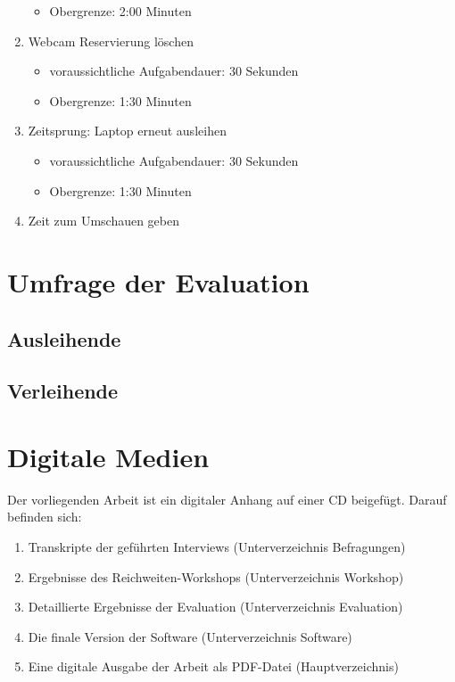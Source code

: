 \begin{enumerate}
\begin{itemize}
                \item Obergrenze: 2:00 Minuten
            \end{itemize}
    \item Webcam Reservierung löschen
            \begin{itemize}
                \item voraussichtliche Aufgabendauer: 30 Sekunden
                \item Obergrenze: 1:30 Minuten
            \end{itemize}
    \item Zeitsprung: Laptop erneut ausleihen
            \begin{itemize}
                \item voraussichtliche Aufgabendauer: 30 Sekunden
                \item Obergrenze: 1:30 Minuten
            \end{itemize}
    \item Zeit zum Umschauen geben
\end{enumerate}

\section{Umfrage der Evaluation}
\subsection{Ausleihende}
\subsection{Verleihende}

\section{Digitale Medien}
Der vorliegenden Arbeit ist ein digitaler Anhang auf einer CD beigefügt. Darauf befinden sich:
{\begin{enumerate}
    \item Transkripte der geführten Interviews (Unterverzeichnis Befragungen)
    \item Ergebnisse des Reichweiten-Workshops (Unterverzeichnis Workshop)
    \item Detaillierte Ergebnisse der Evaluation (Unterverzeichnis Evaluation)
    \item Die finale Version der Software (Unterverzeichnis Software)
    \item Eine digitale Ausgabe der Arbeit als PDF-Datei (Hauptverzeichnis)
\end{enumerate}}